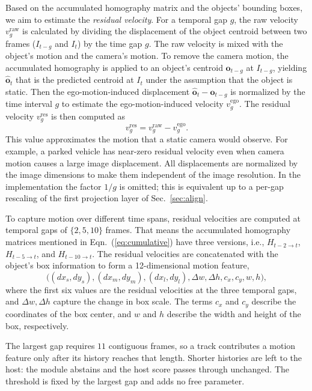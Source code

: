 \documentclass{article}
\begin{document}
Based on the accumulated homography matrix and the objects' bounding boxes, we aim to estimate the \emph{residual velocity}. For a temporal gap $g$, the raw velocity $v^{\mathrm{raw}}_{g}$ is calculated by dividing the displacement of the object centroid between two frames ($I_{t-g}$ and $I_{t}$) by the time gap $g$. The raw velocity is mixed with the object's motion and the camera's motion. To remove the camera motion, the accumulated homography is applied to an object's centroid $\boldsymbol{o}_{t-g}$ at $I_{t-g}$, yielding $\hat{\boldsymbol{o}}_{t}$ that is the predicted centroid at $I_{t}$ under the assumption that the object is static. Then the ego-motion-induced displacement $\hat{\boldsymbol{o}}_{t}-\boldsymbol{o}_{t-g}$ is normalized by the time interval $g$ to estimate the ego-motion-induced velocity $v^{\mathrm{ego}}_{g}$. The residual velocity $v^{\mathrm{res}}_{g}$ is then computed as
\begin{equation}
  v^{\mathrm{res}}_{g} = v^{\mathrm{raw}}_{g} - v^{\mathrm{ego}}_{g}.
  \label{eq:residual}
\end{equation}
This value approximates the motion that a static camera would observe. For example, a parked vehicle has near-zero residual velocity even when camera motion causes a large image displacement. All displacements are normalized by the image dimensions to make them independent of the image resolution. In the implementation the factor $1/g$ is omitted; this is equivalent up to a per-gap rescaling of the first projection layer of Sec.~\ref{sec:align}.

To capture motion over different time spans, residual velocities are computed at temporal gaps of $\{2,5,10\}$ frames. That means the accumulated homography matrices mentioned in Eqn.~(\ref{eq:cumulative}) have three versions, i.e., $H_{t-2 \to t}$, $H_{t-5 \to t}$, and $H_{t-10 \to t}$. The residual velocities are concatenated with the object's box information to form a 12-dimensional motion feature,
\begin{equation}
  \bigl((dx_s,dy_s),(dx_m,dy_m),(dx_l,dy_l),\Delta w,\Delta h,c_x,c_y,w,h\bigr),
  \label{eq:descriptor}
\end{equation}
where the first six values are the residual velocities at the three temporal gaps, and $\Delta w, \Delta h$ capture the change in box scale. The terms $c_x$ and $c_y$ describe the coordinates of the box center, and $w$ and $h$ describe the width and height of the box, respectively.

The largest gap requires $11$ contiguous frames, so a track contributes a motion feature only after its history reaches that length. Shorter histories are left to the host: the module abstains and the host score passes through unchanged. The threshold is fixed by the largest gap and adds no free parameter.
\end{document}

